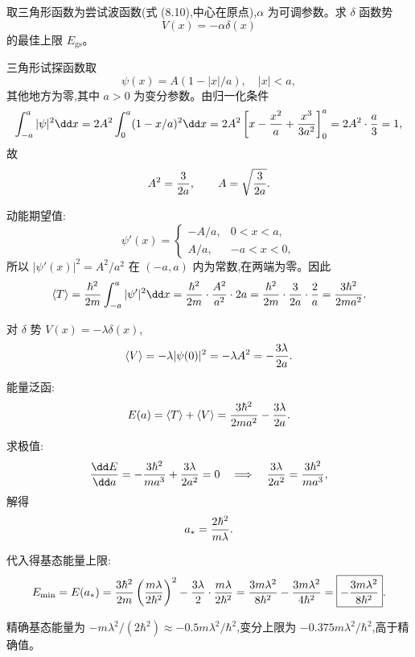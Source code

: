 \begin{question}
取三角形函数为尝试波函数(式 (8.10),中心在原点),$\alpha$ 为可调参数。求 $\delta$ 函数势
\[
V(x)=-\alpha\delta(x)
\]
的最佳上限 $E_{\mathrm{gs}}$。

\par\smallskip
{}

\end{question}
\begin{solution}
三角形试探函数取
\[
\psi(x)=A(1-|x|/a),\quad |x|<a,
\]
其他地方为零,其中 $a>0$ 为变分参数。由归一化条件
\[
\int_{-a}^a|\psi|^2\dd x=2A^2\int_0^a(1-x/a)^2\dd x
=2A^2\left[x-{x^2\over a}+{x^3\over3a^2}\right]_0^a
=2A^2\cdot{a\over3}=1,
\]
故
\[
A^2={3\over2a},\qquad A=\sqrt{3\over2a}.
\]

动能期望值:
\[
\psi'(x)=\begin{cases}
-A/a, & 0<x<a,\\
A/a, & -a<x<0,
\end{cases}
\]
所以 $|\psi'(x)|^2=A^2/a^2$ 在 $(-a,a)$ 内为常数,在两端为零。因此
\[
\langle T\rangle={\hbar^2\over2m}\int_{-a}^a|\psi'|^2\dd x
={\hbar^2\over2m}\cdot{A^2\over a^2}\cdot 2a
={\hbar^2\over2m}\cdot{3\over2a}\cdot{2\over a}
={3\hbar^2\over2ma^2}.
\]

对 $\delta$ 势 $V(x)=-\lambda\delta(x)$,
\[
\langle V\rangle=-\lambda|\psi(0)|^2=-\lambda A^2=-{3\lambda\over2a}.
\]

能量泛函:
\[
E(a)=\langle T\rangle+\langle V\rangle
={3\hbar^2\over2ma^2}-{3\lambda\over2a}.
\]

求极值:
\[
{\dd E\over\dd a}=-{3\hbar^2\over ma^3}+{3\lambda\over2a^2}=0
\quad\Longrightarrow\quad
{3\lambda\over2a^2}={3\hbar^2\over ma^3},
\]
解得
\[
a_*={2\hbar^2\over m\lambda}.
\]

代入得基态能量上限:
\[
E_{\min}=E(a_*)={3\hbar^2\over2m}\left({m\lambda\over2\hbar^2}\right)^2
-{3\lambda\over2}\cdot{m\lambda\over2\hbar^2}
={3m\lambda^2\over8\hbar^2}-{3m\lambda^2\over4\hbar^2}
=\boxed{-{3m\lambda^2\over8\hbar^2}}.
\]

精确基态能量为 $-m\lambda^2/(2\hbar^2)\approx-0.5m\lambda^2/\hbar^2$,变分上限为 $-0.375m\lambda^2/\hbar^2$,高于精确值。
\end{solution}

